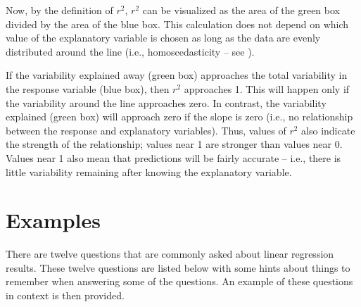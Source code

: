 \documentclass[10pt,openany]{book}\usepackage[]{graphicx}\usepackage[]{color}
\begin{document}
Now, by the definition of $r^{2}$, $r^{2}$ can be visualized as the area of the green box divided by the area of the blue box. This calculation does not depend on which value of the explanatory variable is chosen as long as the data are evenly distributed around the line (i.e., homoscedasticity -- see ).

If the variability explained away (green box) approaches the total variability in the response variable (blue box), then $r^{2}$ approaches 1. This will happen only if the variability around the line approaches zero. In contrast, the variability explained (green box) will approach zero if the slope is zero (i.e., no relationship between the response and explanatory variables). Thus, values of $r^{2}$ also indicate the strength of the relationship; values near 1 are stronger than values near 0. Values near 1 also mean that predictions will be fairly accurate -- i.e., there is little variability remaining after knowing the explanatory variable.



\section{Examples}
There are twelve questions that are commonly asked about linear regression results. These twelve questions are listed below with some hints about things to remember when answering some of the questions. An example of these questions in context is then provided.
\end{document}
